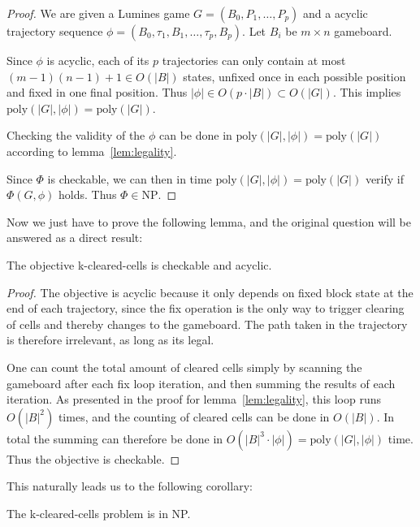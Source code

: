 \begin{proof}
We are given a Lumines game $G = (B_0, P_1, \ldots, P_p)$ and a acyclic trajectory sequence $\phi = (B_0, \tau_1, B_1, \ldots ,\tau_p, B_p)$. Let $B_i$ be $m \times n$ gameboard.

Since $\phi$ is acyclic, each of its $p$ trajectories can only contain at most $(m-1)(n-1) + 1 \in O(|B|)$ states, unfixed once in each possible position and fixed in one final position. Thus $|\phi| \in O(p \cdot |B|) \subset O(|G|)$. This implies $\text{poly}(|G|, |\phi|) = \text{poly}(|G|)$.

Checking the validity of the $\phi$ can be done in $\text{poly}(|G|, |\phi|) = \text{poly}(|G|)$ according to lemma~\ref{lem:legality}.

Since $\Phi$ is checkable, we can then in time $\text{poly}(|G|, |\phi|) = \text{poly}(|G|)$ verify if $\Phi(G, \phi)$ holds. Thus $\Phi \in \text{NP}$.
\end{proof}

Now we just have to prove the following lemma, and the original question will be answered as a direct result:\\

\begin{lem}
The objective k-cleared-cells is checkable and acyclic.
\end{lem}

\begin{proof}
The objective is acyclic because it only depends on fixed block state at the end of each trajectory, since the fix operation is the only way to trigger clearing of cells and thereby changes to the gameboard. The path taken in the trajectory is therefore irrelevant, as long as its legal. 

One can count the total amount of cleared cells simply by scanning the gameboard after each fix loop iteration, and then summing the results of each iteration. As presented in the proof for lemma~\ref{lem:legality}, this loop runs $O(|B|^2)$ times, and the counting of cleared cells can be done in $O(|B|)$. In total the summing can therefore be done in $O(|B|^3 \cdot |\phi|) = \text{poly}(|G|, |\phi|)$ time. Thus the objective is checkable.
\end{proof}

This naturally leads us to the following corollary:\\

\begin{cor}
The k-cleared-cells problem is in NP.
\end{cor}
